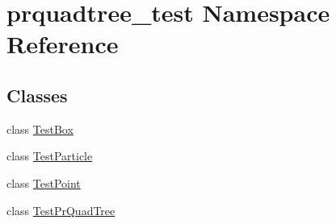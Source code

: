 \hypertarget{namespaceprquadtree__test}{}\section{prquadtree\+\_\+test Namespace Reference}
\label{namespaceprquadtree__test}
\subsection*{Classes}
\begin{DoxyCompactItemize}
\item 
class \hyperlink{classprquadtree__test_1_1TestBox}{Test\+Box}
\item 
class \hyperlink{classprquadtree__test_1_1TestParticle}{Test\+Particle}
\item 
class \hyperlink{classprquadtree__test_1_1TestPoint}{Test\+Point}
\item 
class \hyperlink{classprquadtree__test_1_1TestPrQuadTree}{Test\+Pr\+Quad\+Tree}
\end{DoxyCompactItemize}
